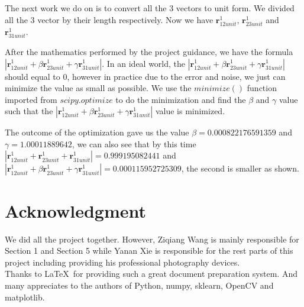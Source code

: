 \documentclass[10pt,twocolumn,letterpaper]{article}
\begin{document}
The next work we do on is to convert all the 3 vectors to unit form. We divided all the 3 vector by their length respectively. Now we have $\textbf{r}_{12unit}^{1}$, $\textbf{r}_{23unit}^{1}$ and $\textbf{r}_{31unit}^{1}$. 

After the mathematics performed by the project guidance, we have the formula $| \textbf{r}_{12unit}^{1} + \beta  \textbf{r}_{23unit}^{1} + \gamma  \textbf{r}_{31unit}^{1} |$. In an ideal world, the $| \textbf{r}_{12unit}^{1} + \beta  \textbf{r}_{23unit}^{1} + \gamma  \textbf{r}_{31unit}^{1} |$ should equal to $0$, however in practice due to the error and noise, we just can minimize the value as small as possible. We use the $minimize()$ function imported from $scipy.optimize$ to do the minimization and find the $\beta$ and $\gamma$ value such that the $| \textbf{r}_{12unit}^{1} + \beta  \textbf{r}_{23unit}^{1} + \gamma  \textbf{r}_{31unit}^{1} |$ value is minimized.

The outcome of the optimization gave us the value  $\beta = 0.000822176591359$ and $\gamma = 1.00011889642$, we can also see that by this time $| \textbf{r}_{12unit}^{1} +  \textbf{r}_{23unit}^{1} +  \textbf{r}_{31unit}^{1} | = 0.999195082441$ and $| \textbf{r}_{12unit}^{1} + \beta  \textbf{r}_{23unit}^{1} + \gamma  \textbf{r}_{31unit}^{1} | = 0.000115952725309$, the second is smaller as shown.


\section{Acknowledgment}
We did all the project together. However, Ziqiang Wang is mainly responsible for
Section 1 and Section 5 while Yanan Xie is responsible for the rest parts of this project including providing his professional photography devices.\\

Thanks to \LaTeX\ for providing such a great document preparation system. And many appreciates to the authors of Python, numpy, sklearn, OpenCV and matplotlib.\\
\end{document}
